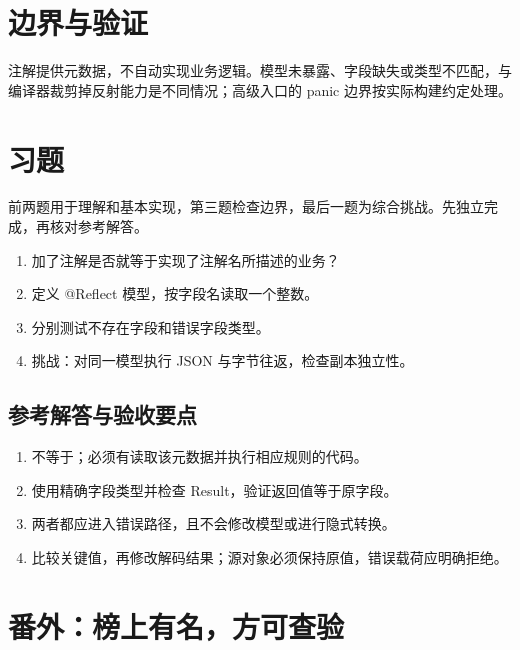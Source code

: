 \section{边界与验证}

注解提供元数据，不自动实现业务逻辑。模型未暴露、字段缺失或类型不匹配，与编译器裁剪掉反射能力是不同情况；高级入口的 panic 边界按实际构建约定处理。

\section{习题}

前两题用于理解和基本实现，第三题检查边界，最后一题为综合挑战。先独立完成，再核对参考解答。

\begin{enumerate}

\item 加了注解是否就等于实现了注解名所描述的业务？

\item 定义 @Reflect 模型，按字段名读取一个整数。

\item 分别测试不存在字段和错误字段类型。

\item 挑战：对同一模型执行 JSON 与字节往返，检查副本独立性。

\end{enumerate}

\subsection*{参考解答与验收要点}

\begin{enumerate}

\item 不等于；必须有读取该元数据并执行相应规则的代码。

\item 使用精确字段类型并检查 Result，验证返回值等于原字段。

\item 两者都应进入错误路径，且不会修改模型或进行隐式转换。

\item 比较关键值，再修改解码结果；源对象必须保持原值，错误载荷应明确拒绝。

\end{enumerate}

\section{番外：榜上有名，方可查验}

